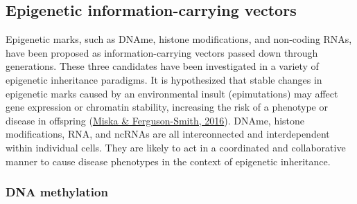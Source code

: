 \documentclass[12pt,twoside]{reedthesis}
\begin{document}
\hypertarget{epigenetic-information-carrying-vectors}{%
\subsection*{Epigenetic information-carrying vectors}\label{epigenetic-information-carrying-vectors}}

Epigenetic marks, such as DNAme, histone modifications, and non-coding
RNAs, have been proposed as information-carrying vectors passed down
through generations. These three candidates have been investigated in a
variety of epigenetic inheritance paradigms. It is hypothesized that
stable changes in epigenetic marks caused by an environmental insult
(epimutations) may affect gene expression or chromatin stability,
increasing the risk of a phenotype or disease in offspring (\protect\hyperlink{ref-miska2016}{Miska \& Ferguson-Smith, 2016}).
DNAme, histone modifications, RNA, and ncRNAs are all interconnected and
interdependent within individual cells. They are likely to act in a
coordinated and collaborative manner to cause disease phenotypes in the
context of epigenetic inheritance.

\hypertarget{dna-methylation}{%
\subsubsection*{DNA methylation}\label{dna-methylation}}
\end{document}

